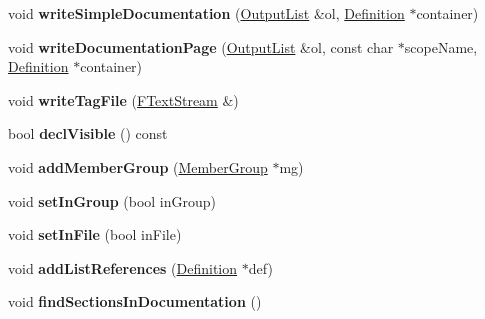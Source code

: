 \begin{DoxyCompactItemize}
\item 
\mbox{\label{class_member_list_a276d3226e9a4cfb2dd121171f71ccd33}} 
void {\bfseries write\+Simple\+Documentation} (\mbox{\hyperlink{class_output_list}{Output\+List}} \&ol, \mbox{\hyperlink{class_definition}{Definition}} $\ast$container)
\item 
\mbox{\label{class_member_list_a033f3f3b8e09b52c7450c2bba36c9677}} 
void {\bfseries write\+Documentation\+Page} (\mbox{\hyperlink{class_output_list}{Output\+List}} \&ol, const char $\ast$scope\+Name, \mbox{\hyperlink{class_definition}{Definition}} $\ast$container)
\item 
\mbox{\label{class_member_list_ad088848472057e874fc8dde92172b9e8}} 
void {\bfseries write\+Tag\+File} (\mbox{\hyperlink{class_f_text_stream}{F\+Text\+Stream}} \&)
\item 
\mbox{\label{class_member_list_af3e9802567a6e2df20e4714a7aed3807}} 
bool {\bfseries decl\+Visible} () const
\item 
\mbox{\label{class_member_list_adc15114590d159b32413338d71ad9de9}} 
void {\bfseries add\+Member\+Group} (\mbox{\hyperlink{class_member_group}{Member\+Group}} $\ast$mg)
\item 
\mbox{\label{class_member_list_a48603d9735ed6f2bd45823021871b3ec}} 
void {\bfseries set\+In\+Group} (bool in\+Group)
\item 
\mbox{\label{class_member_list_ae0019aeb101bfc9f0415e1dd1dabe93e}} 
void {\bfseries set\+In\+File} (bool in\+File)
\item 
\mbox{\label{class_member_list_a332043aa0d664d063e7fcc0614acbeea}} 
void {\bfseries add\+List\+References} (\mbox{\hyperlink{class_definition}{Definition}} $\ast$def)
\item 
\mbox{\label{class_member_list_aaa55d0c345ead76ca26487b3eaf775d7}} 
void {\bfseries find\+Sections\+In\+Documentation} ()
\item 
\mbox{\label{class_member_list_a8c36bc97e2c74001d67b538ef3568121}} 

\end{DoxyCompactItemize}
